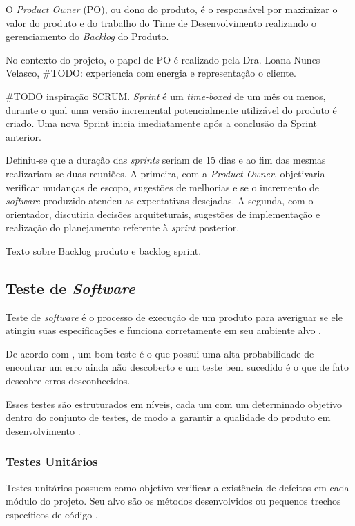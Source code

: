     O \textit{Product Owner} (PO), ou dono do produto, é o responsável por maximizar o valor
    do produto e do trabalho do Time de Desenvolvimento realizando o gerenciamento
    do \textit{Backlog} do Produto.

    No contexto do projeto, o papel de PO é realizado pela
    Dra. Loana Nunes Velasco, \#TODO: experiencia com energia e representação o cliente.

    \#TODO inspiração SCRUM. \textit{Sprint} é um \textit{time-boxed} de um mês ou menos, durante o qual
    uma versão incremental potencialmente utilizável do produto é criado.
    Uma nova Sprint inicia imediatamente após a conclusão da Sprint anterior.

    Definiu-se que a duração das \textit{sprints} seriam de 15 dias e ao fim das mesmas
    realizariam-se duas reuniões. A primeira, com a \textit{Product Owner}, objetivaria verificar mudanças de escopo, sugestões de melhorias e se o incremento de \textit{software} produzido atendeu as expectativas desejadas. A segunda,
    com o orientador, discutiria decisões arquiteturais, sugestões de implementação e realização
    do planejamento referente à \textit{sprint} posterior.

    Texto sobre Backlog produto e backlog sprint.

    \subsection{Teste de \textit{Software}}
    Teste de \textit{software} é o processo de execução de um produto para averiguar se ele atingiu suas especificações e funciona corretamente em seu ambiente alvo \cite{artigo_intro_teste}.

    De acordo com , um bom teste é o que possui uma alta probabilidade de encontrar um erro ainda não descoberto e um teste bem sucedido é o que de fato descobre erros desconhecidos.

    Esses testes são estruturados em níveis, cada um com um determinado objetivo dentro do conjunto de testes, de modo a garantir a qualidade do produto em desenvolvimento \cite{sw_test_tech}.

        \subsubsection{Testes Unitários}
        Testes unitários possuem como objetivo verificar a existência de defeitos em cada módulo do projeto. Seu alvo são os métodos desenvolvidos ou pequenos trechos específicos de código \cite{artigo_intro_teste}.

